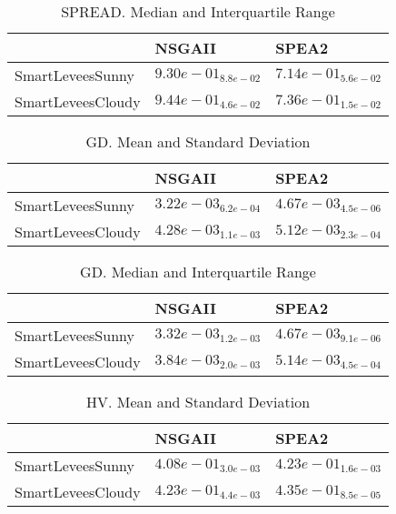 \documentclass{article}
\begin{document}
\begin{table}
\caption{SPREAD. Median and Interquartile Range}
\label{table: SPREAD}
\centering
\begin{scriptsize}
\begin{tabular}{lll}
\hline & NSGAII &  SPEA2\\
\hline 
SmartLeveesSunny & \cellcolor{gray25}$  9.30e-01_{ 8.8e-02}$ & \cellcolor{gray95}$  7.14e-01_{ 5.6e-02}$ \\
SmartLeveesCloudy & \cellcolor{gray25}$  9.44e-01_{ 4.6e-02}$ & \cellcolor{gray95}$  7.36e-01_{ 1.5e-02}$ \\
\hline
\end{tabular}
\end{scriptsize}
\end{table}

\begin{table}
\caption{GD. Mean and Standard Deviation}
\label{table: GD}
\centering
\begin{scriptsize}
\begin{tabular}{lll}
\hline & NSGAII &  SPEA2\\
\hline 
SmartLeveesSunny & \cellcolor{gray95}$  3.22e-03_{ 6.2e-04}$ & \cellcolor{gray25}$  4.67e-03_{ 4.5e-06}$ \\
SmartLeveesCloudy & \cellcolor{gray95}$  4.28e-03_{ 1.1e-03}$ & \cellcolor{gray25}$  5.12e-03_{ 2.3e-04}$ \\
\hline
\end{tabular}
\end{scriptsize}
\end{table}

\begin{table}
\caption{GD. Median and Interquartile Range}
\label{table: GD}
\centering
\begin{scriptsize}
\begin{tabular}{lll}
\hline & NSGAII &  SPEA2\\
\hline 
SmartLeveesSunny & \cellcolor{gray95}$  3.32e-03_{ 1.2e-03}$ & \cellcolor{gray25}$  4.67e-03_{ 9.1e-06}$ \\
SmartLeveesCloudy & \cellcolor{gray95}$  3.84e-03_{ 2.0e-03}$ & \cellcolor{gray25}$  5.14e-03_{ 4.5e-04}$ \\
\hline
\end{tabular}
\end{scriptsize}
\end{table}

\begin{table}
\caption{HV. Mean and Standard Deviation}
\label{table: HV}
\centering
\begin{scriptsize}
\begin{tabular}{lll}
\hline & NSGAII &  SPEA2\\
\hline 
SmartLeveesSunny & \cellcolor{gray25}$  4.08e-01_{ 3.0e-03}$ & \cellcolor{gray95}$  4.23e-01_{ 1.6e-03}$ \\
SmartLeveesCloudy & \cellcolor{gray25}$  4.23e-01_{ 4.4e-03}$ & \cellcolor{gray95}$  4.35e-01_{ 8.5e-05}$ \\
\hline
\end{tabular}
\end{scriptsize}
\end{table}
\end{document}
